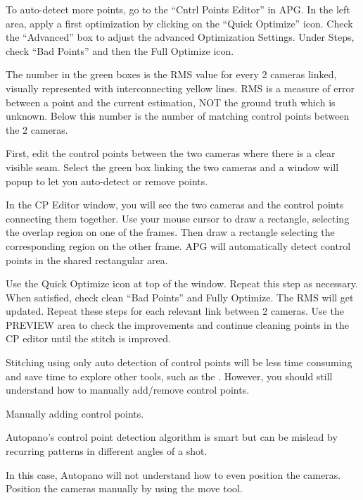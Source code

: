 \begin{fullwidth}

To auto-detect more points, go to the “Cntrl Points Editor” in APG. In the left area, apply a first optimization by clicking on the “Quick Optimize” icon. Check the “Advanced” box to adjust the advanced Optimization Settings. Under Steps, check “Bad Points” and then the Full Optimize icon.


The number in the green boxes is the RMS value for every 2 cameras linked, visually represented with interconnecting yellow lines. RMS is a measure of error between a point and the current estimation, NOT the ground truth which is unknown. Below this number is the number of matching control points between the 2 cameras.


First, edit the control points between the two cameras where there is a clear visible seam. Select the green box linking the two cameras and a window will popup to let you auto-detect or remove points.

In the CP Editor window, you will see the two cameras and the control points connecting them together. Use your mouse cursor to draw a rectangle, selecting the overlap region on one of the frames. Then draw a rectangle selecting the corresponding region on the other frame. APG will automatically detect control points in the shared rectangular area. 


Use the Quick Optimize icon at top of the window. Repeat this step as necessary. When satisfied, check clean “Bad Points” and Fully Optimize. The RMS will get updated. Repeat these steps for each relevant link between 2 cameras. Use the PREVIEW area to check the improvements and continue cleaning points in the CP editor until the stitch is improved.

Stitching using only auto detection of control points will be less time consuming and save time to explore other tools, such as the \textbf{}. However, you should still understand how to manually add/remove control points. 

\clearpage
{\large Manually adding control points. \par}

Autopano’s control point detection algorithm is smart but can be mislead by recurring patterns in different angles of a shot. 

In this case, Autopano will not understand how to even position the cameras. Position the cameras manually by using the move tool. 


\end{fullwidth}

